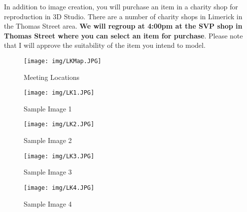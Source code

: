 In addition to image creation, you will purchase an item in a charity shop for reproduction in 3D Studio.  There are a number of charity shops in Limerick in the Thomas Street area.  \textbf{We will regroup at 4:00pm at the SVP shop in Thomas Street where you can select an item for purchase}. Please note that I will approve the suitability of the item you intend to model.\\

\begin{figure}[ht]
	\centering
		\texttt{[image: img/LKMap.JPG]}
	\caption{Meeting Locations}
	\label{fig:LKMap}
\end{figure}



\begin{figure}[ht]
	\centering
		\texttt{[image: img/LK1.JPG]}
	\caption{Sample Image 1}
	\label{fig:LK1}
\end{figure}


\begin{figure}[ht]
	\centering
		\texttt{[image: img/LK2.JPG]}
	\caption{Sample Image 2}
	\label{fig:LK2}
\end{figure}


\begin{figure}[ht]
	\centering
		\texttt{[image: img/LK3.JPG]}
	\caption{Sample Image 3}
	\label{fig:LK3}
\end{figure}

\begin{figure}[ht]
	\centering
		\texttt{[image: img/LK4.JPG]}
	\caption{Sample Image 4}
	\label{fig:LK4}
\end{figure}




